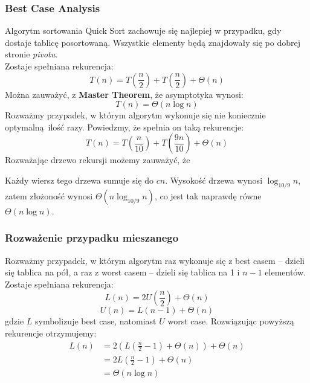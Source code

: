 \documentclass[11pt,a4paper]{article}
\begin{document}
\subsubsection{Best Case Analysis}
Algorytm sortowania Quick Sort zachowuje się najlepiej w przypadku, gdy dostaje tablicę posortowaną. Wszystkie elementy będą znajdowały się po dobrej stronie \textit{pivotu}. \\
Zostaje spełniana rekurencja:
\[
    T(n) = T(\frac{n}{2}) +T(\frac{n}{2}) +\Theta(n)
\]
Można zauważyć, z \textbf{Master Theorem}, że asymptotyka wynosi:
\[
    T(n) = \Theta(n \log n)
\]
Rozważmy przypadek, w którym algorytm wykonuje się nie koniecznie optymalną ilość razy. Powiedzmy, że spełnia on taką rekurencje:
\[
    T(n) =T(\frac{n}{10}) +T(\frac{9n}{10}) +\Theta(n)
\]
Rozważając drzewo rekursji możemy zauważyć, że

\begin{center}\end{center}
Każdy wiersz tego drzewa sumuje się do $cn$. Wysokość drzewa wynosi $\log_{10/9} n$, zatem złożoność wynosi $\Theta(n \log_{10/9} n)$, co jest tak naprawdę równe $\Theta(n \log n)$.
\subsubsection{Rozważenie przypadku mieszanego}
Rozważmy przypadek, w którym algorytm raz wykonuje się z best casem -- dzieli się tablica na pół, a raz z worst casem -- dzieli się tablica na 1 i $n-1$ elementów. \\
Zostaje spełniana rekurencja:
\[
    L(n) = 2U(\frac{n}{2}) + \Theta(n)
\]
\[
    U(n) = L(n-1) + \Theta(n)
\]
gdzie $L$ symbolizuje best case, natomiast $U$ worst case. Rozwiązując powyższą rekurencje otrzymujemy:
\begin{equation*}
    \begin{aligned}
        L(n)
        &= 2(L(\frac{n}{2} -1) +\Theta(n)) + \Theta(n) \\
        &= 2L(\frac{n}{2} -1) + \Theta(n) \\
        &= \Theta(n \log n)
    \end{aligned}
\end{equation*}
\end{document}
